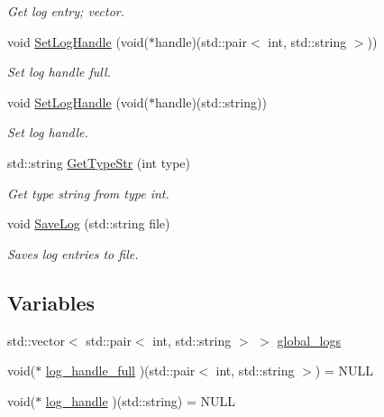 \begin{DoxyCompactItemize}
\begin{DoxyCompactList}\small\item\em Get log entry; vector. \end{DoxyCompactList}\item 
void \hyperlink{namespacepessum_1_1log_a3dad780e9e79cf9184fcaaed11b30745}{Set\+Log\+Handle} (void($\ast$handle)(std\+::pair$<$ int, std\+::string $>$))
\begin{DoxyCompactList}\small\item\em Set log handle full. \end{DoxyCompactList}\item 
void \hyperlink{namespacepessum_1_1log_a4a1f2b59bfce86460538cee3b29d1d1f}{Set\+Log\+Handle} (void($\ast$handle)(std\+::string))
\begin{DoxyCompactList}\small\item\em Set log handle. \end{DoxyCompactList}\item 
std\+::string \hyperlink{namespacepessum_1_1log_a399df8bb8a0d02825ace8797daf286f6}{Get\+Type\+Str} (int type)
\begin{DoxyCompactList}\small\item\em Get type string from type int. \end{DoxyCompactList}\item 
void \hyperlink{namespacepessum_1_1log_a0a9fc4d6d3bc08921c38bf3b9c8615d6}{Save\+Log} (std\+::string file)
\begin{DoxyCompactList}\small\item\em Saves log entries to file. \end{DoxyCompactList}\end{DoxyCompactItemize}
\subsection*{Variables}
\begin{DoxyCompactItemize}
\item 
std\+::vector$<$ std\+::pair$<$ int, std\+::string $>$ $>$ \hyperlink{namespacepessum_1_1log_a8a1cb7b63dbf69c0f4c6c155e09ea5c1}{global\+\_\+logs}
\item 
void($\ast$ \hyperlink{namespacepessum_1_1log_aa25914cc49048e5934cd41f86e74390f}{log\+\_\+handle\+\_\+full} )(std\+::pair$<$ int, std\+::string $>$) = N\+U\+LL
\item 
void($\ast$ \hyperlink{namespacepessum_1_1log_a108e1c71c8daf36fe556a757a67cb7e3}{log\+\_\+handle} )(std\+::string) = N\+U\+LL
\end{DoxyCompactItemize}


